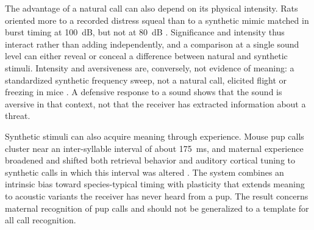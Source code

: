 The advantage of a natural call can also depend on its physical intensity. Rats oriented more to a recorded distress squeal than to a synthetic mimic matched in burst timing at 100~dB, but not at 80~dB \citep{EvansHammond1983a}. Significance and intensity thus interact rather than adding independently, and a comparison at a single sound level can either reveal or conceal a difference between natural and synthetic stimuli. Intensity and aversiveness are, conversely, not evidence of meaning:
a standardized synthetic frequency sweep, not a natural call, elicited flight or freezing in mice \citep{MongeauEtAl2003}. A defensive response to a sound shows that the sound is aversive in that context, not that the receiver has extracted information about a threat.

Synthetic stimuli can also acquire meaning through experience. Mouse pup calls cluster near an inter-syllable interval of about 175~ms, and maternal experience broadened and shifted both retrieval behavior and auditory cortical tuning to synthetic calls in which this interval was altered \citep{SchiavoEtAl2020}. The system combines an intrinsic bias toward species-typical timing with plasticity that extends meaning to acoustic variants the receiver has never heard from a pup. The result concerns maternal recognition of pup calls and should not be generalized to a template for all call recognition.

